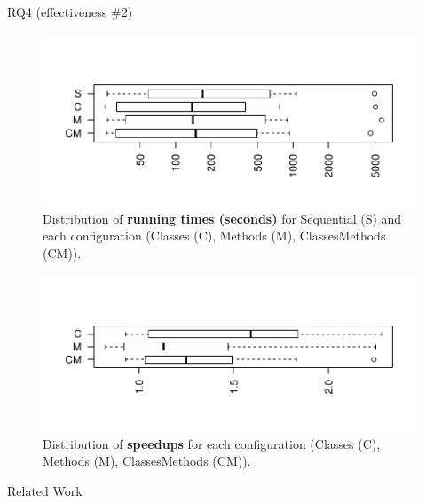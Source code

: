 \documentclass{beamer}
\begin{document}
\begin{frame}{RQ4 (effectiveness \#2)}
	\vspace{-1.2cm}
	\begin{figure}
		\centering
		\includegraphics[width=\linewidth]{images/time.pdf}
		\vspace{-1.4cm}
		\caption*{Distribution of {\rsm \textbf{\tname{} running times (seconds)}} for Sequential (S) and each configuration (Classes (C), Methods (M), ClassesMethods (CM)).}
	\end{figure}
	\vspace{-1.25cm}\pause
	\begin{figure}
		\centering
		\includegraphics[width=\linewidth]{images/speedup.pdf}
		\vspace{-1.6cm}
		\caption*{Distribution of {\rsm \textbf{speedups}} for each configuration (Classes (C), Methods (M), ClassesMethods (CM)).}
	\end{figure}
\end{frame}

\begingroup
\renewcommand{\disp}{}
\begin{frame}
	\begin{center}
		Related Work
	\end{center}
\end{frame}
\endgroup
\addtocounter{framenumber}{-1}
\end{document}
